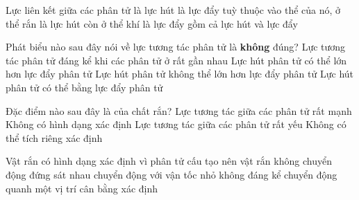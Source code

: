 \begin{ex}
	Lực liên kết giữa các phân tử	
	\choice
	{là lực hút}
	{là lực đẩy}
	{tuỳ thuộc vào thể của nó, ở thể rắn là lực hút còn ở thể khí là lực đẩy}
	{\True gồm cả lực hút và lực đẩy}
\end{ex}

\begin{ex}
	Phát biểu nào sau đây nói về lực tương tác phân tử là \textbf{không} đúng?
	\choice
	{Lực tương tác phân tử đáng kể khi các phân tử ở rất gần nhau}
	{Lực hút phân tử có thể lớn hơn lực đẩy phân tử}
	{\True Lực hút phân tử không thể lớn hơn lực đẩy phân tử}
	{Lực hút phân tử có thể bằng lực đẩy phân tử}
\end{ex}












\begin{ex}
	Đặc điểm nào sau đây là của chất rắn?
	\choice
	{\True Lực tương tác giữa các phân tử rất mạnh}
	{Không có hình dạng xác định}
	{Lực tương tác giữa các phân tử rất yếu}
	{Không có thể tích riêng xác định}
\end{ex}

\begin{ex}
	Vật rắn có hình dạng xác định vì phân tử cấu tạo nên vật rắn
	\choice
	{không chuyển động}
	{đứng sát nhau}
	{chuyển động với vận tốc nhỏ không đáng kể}
	{\True chuyển động quanh một vị trí cân bằng xác định}
\end{ex}

